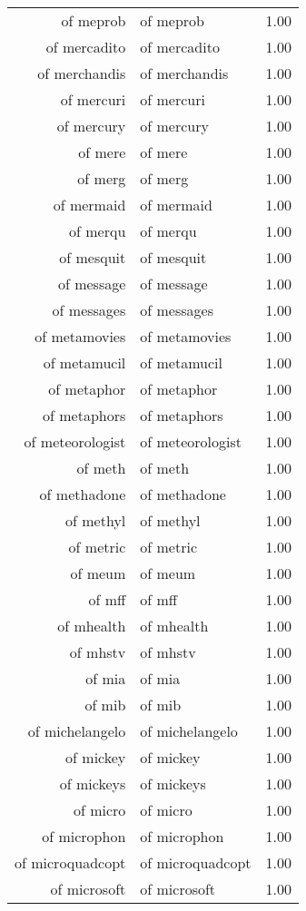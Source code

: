 \begin{table}[ht]
\begin{tabular}{rlr}
  of meprob & of meprob & 1.00 \\ 
  of mercadito & of mercadito & 1.00 \\ 
  of merchandis & of merchandis & 1.00 \\ 
  of mercuri & of mercuri & 1.00 \\ 
  of mercury & of mercury & 1.00 \\ 
  of mere & of mere & 1.00 \\ 
  of merg & of merg & 1.00 \\ 
  of mermaid & of mermaid & 1.00 \\ 
  of merqu & of merqu & 1.00 \\ 
  of mesquit & of mesquit & 1.00 \\ 
  of message & of message & 1.00 \\ 
  of messages & of messages & 1.00 \\ 
  of metamovies & of metamovies & 1.00 \\ 
  of metamucil & of metamucil & 1.00 \\ 
  of metaphor & of metaphor & 1.00 \\ 
  of metaphors & of metaphors & 1.00 \\ 
  of meteorologist & of meteorologist & 1.00 \\ 
  of meth & of meth & 1.00 \\ 
  of methadone & of methadone & 1.00 \\ 
  of methyl & of methyl & 1.00 \\ 
  of metric & of metric & 1.00 \\ 
  of meum & of meum & 1.00 \\ 
  of mff & of mff & 1.00 \\ 
  of mhealth & of mhealth & 1.00 \\ 
  of mhstv & of mhstv & 1.00 \\ 
  of mia & of mia & 1.00 \\ 
  of mib & of mib & 1.00 \\ 
  of michelangelo & of michelangelo & 1.00 \\ 
  of mickey & of mickey & 1.00 \\ 
  of mickeys & of mickeys & 1.00 \\ 
  of micro & of micro & 1.00 \\ 
  of microphon & of microphon & 1.00 \\ 
  of microquadcopt & of microquadcopt & 1.00 \\ 
  of microsoft & of microsoft & 1.00 \\ 

\end{tabular}
\end{table}
